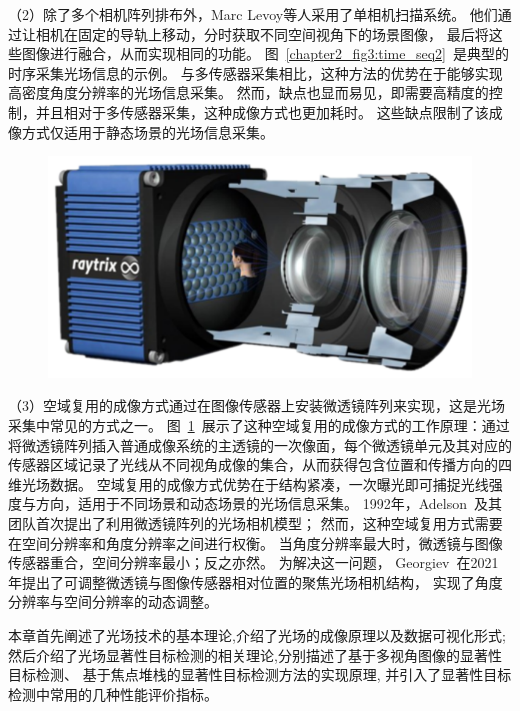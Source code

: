 （2）除了多个相机阵列排布外，Marc Levoy等人\cite{levoy2023light}采用了单相机扫描系统。
他们通过让相机在固定的导轨上移动，分时获取不同空间视角下的场景图像，
最后将这些图像进行融合，从而实现相同的功能。
图~\ref{chapter2_fig3:time_seq2}~是典型的时序采集光场信息的示例。
与多传感器采集相比，这种方法的优势在于能够实现高密度角度分辨率的光场信息采集。
然而，缺点也显而易见，即需要高精度的控制，并且相对于多传感器采集，这种成像方式也更加耗时。
这些缺点限制了该成像方式仅适用于静态场景的光场信息采集。\par
%
%
%
%
%
\begin{figure}[!ht]
	\centering
	\includegraphics[width=0.90\linewidth]{figures/chapter2/microlens_for_lf_imaging2.drawio}
	\label{chapter2_fig4:microlens_for_lf_imaging}
\end{figure}
（3）空域复用的成像方式通过在图像传感器上安装微透镜阵列来实现，这是光场采集中常见的方式之一。
图~\ref{chapter2_fig4:microlens_for_lf_imaging}~展示了这种空域复用的成像方式的工作原理：通过将微透镜阵列插入普通成像系统的主透镜的一次像面，每个微透镜单元及其对应的传感器区域记录了光线从不同视角成像的集合，从而获得包含位置和传播方向的四维光场数据。
空域复用的成像方式优势在于结构紧凑，一次曝光即可捕捉光线强度与方向，适用于不同场景和动态场景的光场信息采集。
1992年，Adelson~\cite{adelson1992single}及其团队首次提出了利用微透镜阵列的光场相机模型；
然而，这种空域复用方式需要在空间分辨率和角度分辨率之间进行权衡。
当角度分辨率最大时，微透镜与图像传感器重合，空间分辨率最小；反之亦然。
为解决这一问题，
Georgiev~\cite{georgiev2010focused}在2021年提出了可调整微透镜与图像传感器相对位置的聚焦光场相机结构，
实现了角度分辨率与空间分辨率的动态调整。
%
%
%










本章首先阐述了光场技术的基本理论,介绍了光场的成像原理以及数据可视化形式;
然后介绍了光场显著性目标检测的相关理论,分别描述了基于多视角图像的显著性目标检测、
基于焦点堆栈的显著性目标检测方法的实现原理,
并引入了显著性目标检测中常用的几种性能评价指标。